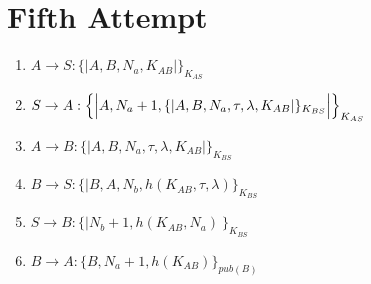 \section{Fifth Attempt}

\begin{enumerate}
    \item $ A \rightarrow S : \{|A, B, N_a, K_{AB}|\}_{K_{AS}}$
    \item $ S \rightarrow A : \Bigl\{\Bigl|A, N_a + 1, \{|A,B,N_a, \tau, \lambda, K_{AB}|\}_{K_{BS}}\Bigr|\Bigr\}_{K_{AS}}$

    \item $ A \rightarrow B : \{|A,B, N_a,  \tau, \lambda, K_{AB} |\}_{K_{BS}}$

    \item $ B \rightarrow S : \{|B, A, N_b, h(K_{AB}, \tau, \lambda)\}_{K_{BS}}$
    \item $ S \rightarrow B : \{|N_b + 1, h(K_{AB}, N_a)\ \}_{K_{BS}}$

    \item $ B \rightarrow A : \{ B, N_a + 1, h(K_{AB})\}_{pub(B)}$


\end{enumerate}